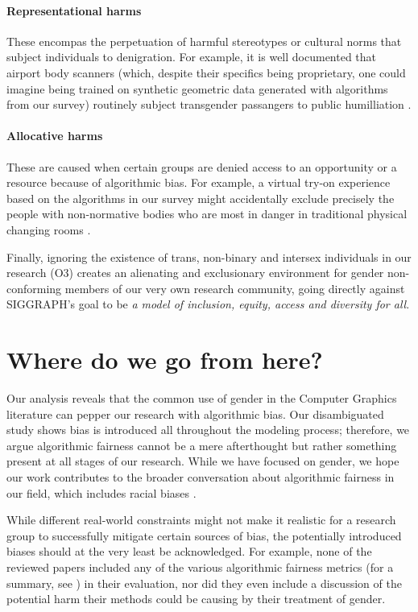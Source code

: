 \documentclass[nonacm,sigconf,review,balance=false]{acmart}
\begin{document}
\paragraph*{Representational harms} These encompas the perpetuation of harmful stereotypes or cultural norms that subject individuals to denigration. For example, it is well documented that airport body scanners (which, despite their specifics being proprietary, one could imagine being trained on synthetic geometric data generated with algorithms from our survey) routinely subject transgender passangers to public humilliation \cite{tsa}.

\paragraph*{Allocative harms} These are caused when certain groups are denied access to an opportunity or a resource because of algorithmic bias. For example, a virtual try-on experience based on the algorithms in our survey might accidentally exclude precisely the people with non-normative bodies who are most in danger in traditional physical changing rooms \cite{changingroom}.

Finally, ignoring the existence of trans, non-binary and intersex individuals in our research (O3) creates an alienating and exclusionary environment for gender non-conforming members of our very own research community, going directly against SIGGRAPH's goal to be \emph{a model of inclusion, equity, access and diversity for all}.

\vspace{-0.1cm}
\section{Where do we go from here?}

Our analysis reveals that the common use of gender in the Computer Graphics literature can pepper our research with algorithmic bias. Our disambiguated study shows bias is introduced all throughout the modeling process; therefore, we argue algorithmic fairness cannot be a mere afterthought but rather something present at all stages of our research. While we have focused on gender, we hope our work contributes to the broader conversation about algorithmic fairness in our field, which includes racial biases \cite{kim2021countering}.

While different real-world constraints might not make it realistic for a research group to successfully mitigate certain sources of bias, the potentially introduced biases should at the very least be acknowledged. For example, none of the reviewed papers included any of the various algorithmic fairness metrics (for a summary, see \cite{fairnesssurvey, fairnessmetrics}) in their evaluation, nor did they even include a discussion of the potential harm their methods could be causing by their treatment of gender.
\end{document}
